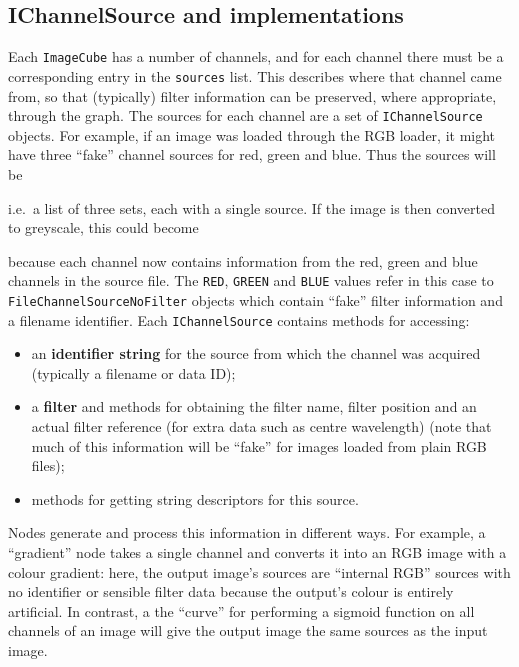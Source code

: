 \subsection{IChannelSource and implementations}
Each \texttt{ImageCube} has a number of channels, and for each channel there must be a corresponding
entry in the \texttt{sources} list. This describes where that channel came from, so that (typically) filter
information can be preserved, where appropriate, through the graph. The sources for each channel are a set
of \texttt{IChannelSource} objects. For example, if an image was loaded through the RGB loader, it might
have three ``fake'' channel sources for red, green and blue. Thus the sources will be 
\begin{v}
\end{v}
i.e.\ a list of three sets, each with a single source.
If the image is then converted to greyscale, this could
become
\begin{v}
\end{v}
because each channel now contains information from the red, green and blue channels in the source file.
The \texttt{RED}, \texttt{GREEN} and \texttt{BLUE} values refer in this case to \texttt{FileChannelSourceNoFilter} objects
which contain ``fake'' filter information and a filename identifier.
Each \texttt{IChannelSource} contains methods for accessing:
\begin{itemize}
\item an \textbf{identifier string} for the source from which the channel was acquired (typically a filename or data ID);
\item a \textbf{filter} and methods for obtaining the filter name, filter position and an actual filter reference (for extra data such as centre wavelength) (note
that much of this information will be ``fake'' for images loaded from plain RGB files);
\item methods for getting string descriptors for this source.
\end{itemize}

Nodes generate and process this information in different ways. For example, a ``gradient'' node takes a single channel and converts it into an RGB image with
a colour gradient: here, the output image's sources are ``internal RGB'' sources with no identifier or sensible filter data because the output's colour
is entirely artificial. In contrast, a the ``curve'' for performing a sigmoid function on all channels of an image will give the output image the
same sources as the input image.

